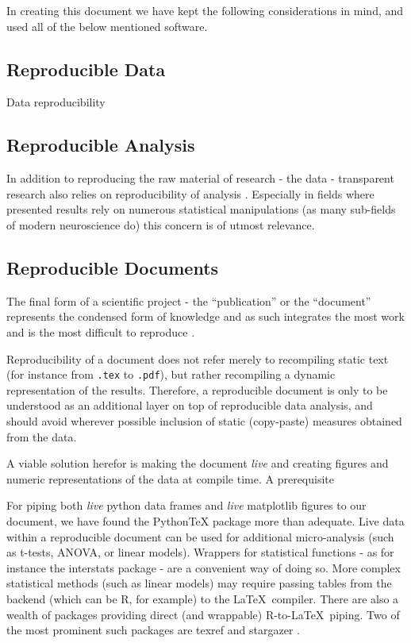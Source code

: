 	In creating this document we have kept the following considerations in mind, and used all of the below mentioned software.
	\subsection{Reproducible Data}\label{sec:b_rr}
	    Data reproducibility 
	\subsection{Reproducible Analysis}\label{sec:b_ra}
	    In addition to reproducing the raw material of research - the data - transparent research also relies on reproducibility of analysis \cite{Peng2009}.
	    Especially in fields where presented results rely on numerous statistical manipulations (as many sub-fields of modern neuroscience do) this concern is of utmost relevance.
	    	    
	\subsection{Reproducible Documents}\label{sec:b_rd}
	    The final form of a scientific project - the “publication” or the “document” represents the condensed form of knowledge and as such integrates the most work and is the most difficult to reproduce \cite{Schwab2000}.
	    
	    Reproducibility of a document does not refer merely to recompiling static text (for instance from \colorbox{vlg}{\texttt{.tex}} to \colorbox{vlg}{\texttt{.pdf}}), but rather recompiling a dynamic representation of the results.
	    Therefore, a reproducible document is only to be understood as an additional layer on top of reproducible data analysis, and should avoid wherever possible inclusion of static (copy-paste) measures obtained from the data. 
	    
	    A viable solution herefor is making the document \textit{live} and creating figures and numeric representations of the data at compile time.
	    A prerequisite 
	    
	    
	    For piping both \textit{live} python data frames and \textit{live} matplotlib figures to our document, we have found the PythonTeX \cite{Poore2013} package more than adequate.
	    Live data within a reproducible document can be used for additional micro-analysis (such as t-tests, ANOVA, or linear models).
	    Wrappers for statistical functions - as for instance the interstats package \cite{interstats} - are a convenient way of doing so.
	    More complex statistical methods (such as linear models) may require passing tables from the backend (which can be R\cite{R}, for example) to the \LaTeX\ compiler.
	    There are also a wealth of packages providing direct (and wrappable) R-to-\LaTeX\ piping.
	    Two of the most prominent such packages are texref \cite{Leifeld2013} and stargazer \cite{Hlavac2013}.
\fi
